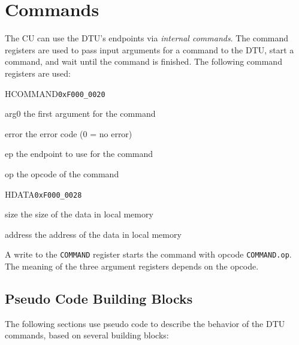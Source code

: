 \documentclass[a4paper,11pt,draft]{article}
\begin{document}
\section{Commands}

The CU can use the DTU's endpoints via \emph{internal commands}. The command registers are used to
pass input arguments for a command to the DTU, start a command, and wait until the command is
finished. The following command registers are used:

\begin{register}{H}{COMMAND}{\texttt{0xF000\_0020}}
  \regnewline%
  \begin{regdesc}\begin{reglist}
    \item[arg0] the first argument for the command
    \item[error] the error code (0 = no error)
    \item[ep] the endpoint to use for the command
    \item[op] the opcode of the command
  \end{reglist}\end{regdesc}
\end{register}

\begin{register}{H}{DATA}{\texttt{0xF000\_0028}}
  \regnewline%
  \begin{regdesc}\begin{reglist}
    \item[size] the size of the data in local memory
    \item[address] the address of the data in local memory
  \end{reglist}\end{regdesc}
\end{register}

\noindent A write to the \texttt{COMMAND} register starts the command with opcode
\texttt{COMMAND.op}. The meaning of the three argument registers depends on the opcode.

\subsection{Pseudo Code Building Blocks}

The following sections use pseudo code to describe the behavior of the DTU commands, based on
several building blocks:
\end{document}

